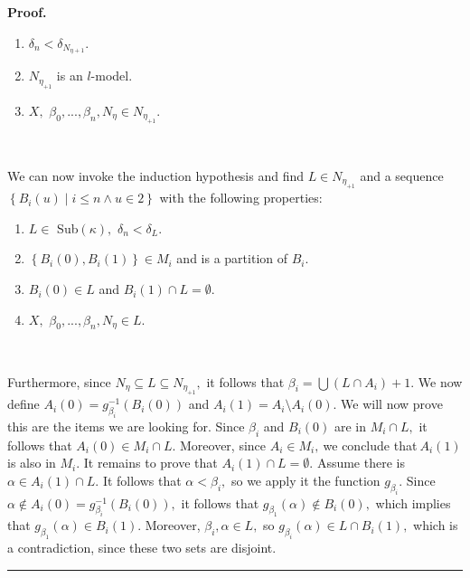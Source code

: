 \documentclass[10pt,a4paper]{amsart}
\newenvironment{proof}[1][Proof]{\noindent\textbf{#1.} }{\ \rule{0.5em}{0.5em}}
\begin{document}
\begin{proof}
\begin{enumerate}
\item $\delta_{n}<\delta_{N_{\eta+1}}.$

\item $N_{\eta_{+1}}$ is an $l$-model.

\item $X,$ $\beta_{0},...,\beta_{n},N_{\eta}\in N_{\eta_{+1}}.$
\end{enumerate}

\qquad\ \ \ 

We can now invoke the induction hypothesis and find $L\in N_{\eta_{+1}}$ and a
sequence $\left\{  B_{i}\left(  u\right)  \mid i\leq n\wedge u\in2\right\}  $
with the following properties:

\begin{enumerate}
\item $L\in$ \textsf{Sub}$\left(  \kappa\right)  ,$ $\delta_{n}<\delta_{L}.$

\item $\left\{  B_{i}\left(  0\right)  ,B_{i}\left(  1\right)  \right\}  \in
M_{i}$ and is a partition of $B_{i}.$

\item $B_{i}\left(  0\right)  \in L$ and $B_{i}\left(  1\right)  \cap
L=\emptyset.$

\item $X,$ $\beta_{0},...,\beta_{n},N_{\eta}\in L.$
\end{enumerate}

\qquad\ \ \qquad\ \ \ 

Furthermore, since $N_{\eta}\subseteq L\subseteq N_{\eta_{+1}},$ it follows
that $\beta_{i}=%
{\displaystyle\bigcup}
\left(  L\cap A_{i}\right)  +1.$ We now define $A_{i}\left(  0\right)
=g_{\beta_{i}}^{-1}\left(  B_{i}\left(  0\right)  \right)  $ and $A_{i}\left(
1\right)  =A_{i}\setminus A_{i}\left(  0\right)  .$ We will now prove this are
the items we are looking for. Since $\beta_{i}$ and $B_{i}\left(  0\right)  $
are in $M_{i}\cap L,$ it follows that $A_{i}\left(  0\right)  \in M_{i}\cap
L.$ Moreover, since $A_{i}\in M_{i},\ $we conclude that$\ A_{i}\left(
1\right)  $ is also in $M_{i}.$ It remains to prove that $A_{i}\left(
1\right)  \cap L=\emptyset.$ Assume there is $\alpha\in A_{i}\left(  1\right)
\cap L.$ It follows that $\alpha<\beta_{i},$ so we apply it the function
$g_{\beta_{i}}.$ Since $\alpha\notin A_{i}\left(  0\right)  =g_{\beta_{i}%
}^{-1}\left(  B_{i}\left(  0\right)  \right)  ,$ it follows that $g_{\beta
_{1}}\left(  \alpha\right)  \notin B_{i}\left(  0\right)  ,$ which implies
that $g_{\beta_{1}}\left(  \alpha\right)  \in B_{i}\left(  1\right)  .$
Moreover, $\beta_{i},\alpha\in L,$ so $g_{\beta_{i}}\left(  \alpha\right)  \in
L\cap B_{i}\left(  1\right)  ,$ which is a contradiction, since these two sets
are disjoint.
\end{proof}
\end{document}
